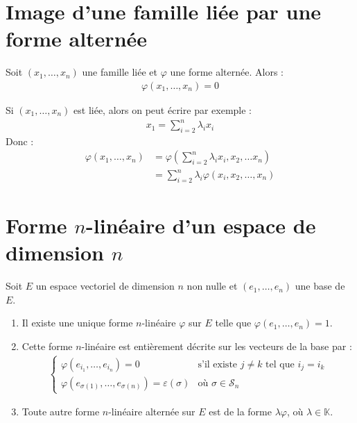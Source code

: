 \documentclass[../main.tex]{subfiles}
\begin{document}
\section{Image d'une famille liée par une forme alternée}
\begin{tcolorbox}[title=Propostion 30.21, title filled=false, colframe=lightblue, colback=lightblue!10!white]
    Soit $(x_1, \ldots, x_n)$ une famille liée et $\varphi$ une forme alternée. Alors :
    \begin{align*}
        \varphi(x_1, \ldots, x_n) = 0
    \end{align*}
\end{tcolorbox}

\noindent Si $(x_1, \ldots, x_n)$ est liée, alors on peut écrire par exemple : 
\begin{align*}
    x_1 = \sum_{i=2}^n \lambda_i x_i
\end{align*}
Donc : 
\begin{align*}
    \varphi(x_1, \ldots, x_n) &= \varphi \left( \sum_{i=2}^{n} \lambda_i x_i, x_2, \ldots x_n \right) \\ 
    &= \sum_{i=2}^{n} \lambda_i \varphi(x_i, x_2, \ldots, x_n)
\end{align*}

\section{Forme $n$-linéaire d'un espace de dimension $n$}
\begin{tcolorbox}[title=Théorème 30.22, title filled=false, colframe=orange, colback=orange!10!white]
    Soit $E$ un espace vectoriel de dimension $n$ non nulle et $(e_1, \ldots, e_n)$ une base de $E$. 
    \begin{enumerate}
        \item Il existe une unique forme $n$-linéaire $\varphi$ sur $E$ telle que $\varphi(e_1, \ldots, e_n) = 1$.
        \item Cette forme $n$-linéaire est entièrement décrite sur les vecteurs de la base par : 
        \begin{align*}
            \begin{cases}
                \varphi(e_{i_1}, \ldots, e_{i_n}) = 0 & \text{s'il existe } j\neq k \text{ tel que } i_j = i_k \\
                \varphi(e_{\sigma(1)}, \ldots, e_{\sigma(n)}) = \varepsilon(\sigma) & \text{où } \sigma\in \mathcal{S}_n
            \end{cases}
        \end{align*}
        \item Toute autre forme $n$-linéaire alternée sur $E$ est de la forme $\lambda \varphi$, où $\lambda\in \mathbb{K}$. 
    \end{enumerate}
\end{tcolorbox}
\end{document}
